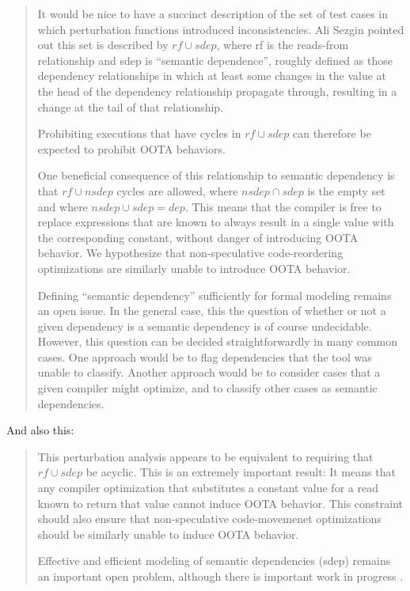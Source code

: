 \begin{quotation}
  It would be nice to have a succinct description of the set of test cases in
  which perturbation functions introduced inconsistencies. Ali Sezgin pointed
  out this set is described by $rf \cup sdep$, where rf is the reads-from
  relationship and sdep is ``semantic dependence'', roughly defined as those
  dependency relationships in which at least some changes in the value at the
  head of the dependency relationship propagate through, resulting in a
  change at the tail of that relationship.

  Prohibiting executions that have cycles in $rf \cup sdep$ can therefore be
  expected to prohibit OOTA behaviors.

  One beneficial consequence of this relationship to semantic dependency is
  that $rf \cup nsdep$ cycles are allowed, where $nsdep \cap sdep$ is the empty set and
  where $nsdep \cup sdep = dep$. This means that the compiler is free to replace
  expressions that are known to always result in a single value with the
  corresponding constant, without danger of introducing OOTA behavior. We
  hypothesize that non-speculative code-reordering optimizations are
  similarly unable to introduce OOTA behavior.

  Defining ``semantic dependency'' sufficiently for formal modeling remains an
  open issue. In the general case, this the question of whether or not a
  given dependency is a semantic dependency is of course
  undecidable. However, this question can be decided straightforwardly in
  many common cases. One approach would be to flag dependencies that the tool
  was unable to classify. Another approach would be to consider cases that a
  given compiler might optimize, and to classify other cases as semantic
  dependencies.
\end{quotation}

And also this:

\begin{quotation}
  This perturbation analysis appears to be equivalent to requiring that $rf \cup
  sdep$ be acyclic. This is an extremely important result: It means that any
  compiler optimization that substitutes a constant value for a read known to
  return that value cannot induce OOTA behavior. This constraint should also
  ensure that non-speculative code-movemenet optimizations should be
  similarly unable to induce OOTA behavior.

  Effective and efficient modeling of semantic dependencies (sdep) remains an
  important open problem, although there is important work in progress
  \cite{Pichon-Pharabod:2016:CSR:2837614.2837616}.
\end{quotation}

